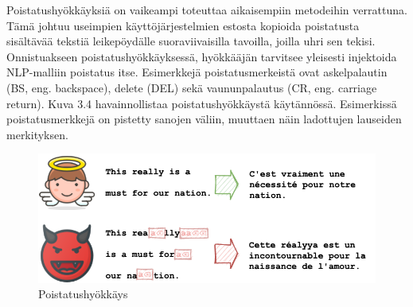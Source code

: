 Poistatushyökkäyksiä on vaikeampi toteuttaa aikaisempiin metodeihin verrattuna. Tämä johtuu useimpien käyttöjärjestelmien estosta kopioida poistatusta sisältävää tekstiä leikepöydälle suoraviivaisilla tavoilla, joilla uhri sen tekisi. Onnistuakseen poistatushyökkäyksessä, hyökkääjän tarvitsee yleisesti injektoida NLP-malliin poistatus itse. Esimerkkejä poistatusmerkeistä ovat askelpalautin (BS, eng. backspace), delete (DEL) sekä vaununpalautus (CR, eng. carriage return). \citep{boucher2021bad}
Kuva 3.4 havainnollistaa poistatushyökkäystä käytännössä. Esimerkissä poistatusmerkkejä on pistetty sanojen väliin, muuttaen näin ladottujen lauseiden merkityksen.
\begin{figure}[t]
  \includegraphics[scale=0.599]{figures/backspace.png}
  \caption{Poistatushyökkäys \citep{boucher2021bad}}
\end{figure}